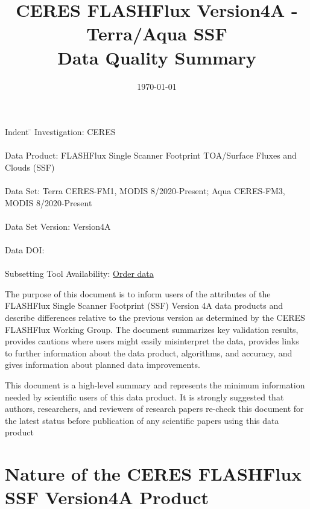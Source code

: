 \documentclass[12pt]{article}
\begin{document}
\title{CERES FLASHFlux Version4A - Terra/Aqua SSF \\
 Data Quality Summary}

\date{\today}

\maketitle

\begin{framed}
\begin{tabbing}
Indent \= \kill
Investigation:  CERES \\
\\
Data Product: FLASHFlux Single Scanner Footprint TOA/Surface Fluxes and Clouds (SSF) \\
\\
Data Set: Terra CERES-FM1, MODIS 8/2020-Present; Aqua CERES-FM3, MODIS 8/2020-Present \\
\\
Data Set Version: Version4A \\
\\
Data DOI: \\
\\
Subsetting Tool Availability: \href {https://ceres-tool.larc.nasa.gov/ord-tool/products?CERESProducts=FLASH_SSF}{Order data}\\ 		
\end{tabbing}

The purpose of this document is to inform users of the attributes of the FLASHFlux Single Scanner Footprint (SSF) Version 4A data products and describe differences relative to the previous version as determined by the CERES FLASHFlux Working Group. The document summarizes key validation results, provides cautions where users might easily misinterpret the data, provides links to further information about the data product, algorithms, and accuracy, and gives information about planned data improvements. 

This document is a high-level summary and represents the minimum information needed by scientific users of this data product. It is strongly suggested that authors, researchers, and reviewers of research papers re-check this document for the latest status before publication of any scientific papers using this data product

\end{framed}

\tableofcontents

\listoffigures
\listoftables
\section{Nature of the CERES FLASHFlux SSF Version4A Product}
\end{document}
